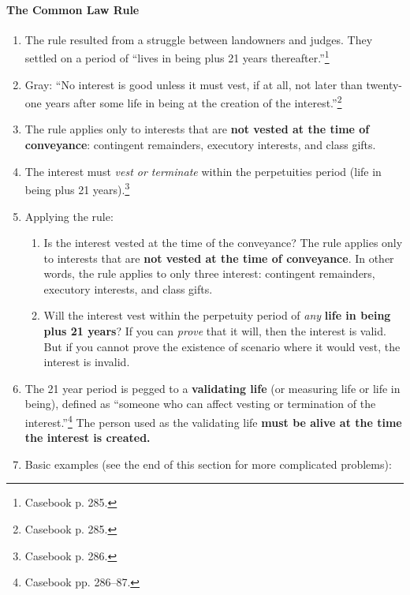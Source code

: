 \paragraph{The Common Law Rule}

\begin{enumerate}
    \item The rule resulted from a struggle between landowners and judges. 
    They settled on a period of ``lives in being plus 21 years 
    thereafter.''\footnote{Casebook p. 285.}
    \item Gray: ``No interest is good unless it must vest, if at all, not 
    later than twenty-one years after some life in being at the creation of 
    the interest.''\footnote{Casebook p. 285.}
    \item The rule applies only to interests that are \textbf{not vested at 
    the time of conveyance}: contingent remainders, executory 
    interests, and class gifts.
    \item The interest must \emph{vest or terminate} within the perpetuities 
    period (life in being plus 21 years).\footnote{Casebook p. 286.}
    \item Applying the rule:
    \begin{enumerate}
        \item Is the interest vested at the time of the conveyance? The rule 
        applies only to interests that are \textbf{not vested at the time of 
        conveyance}. In other words, the rule applies to only three interest: 
        contingent remainders, executory interests, and class gifts.
        \item Will the interest vest within the perpetuity period of 
        \emph{any} \textbf{life in being plus 21 years}? If you can 
        \emph{prove} that it will, then the interest is valid. But if you 
        cannot prove the existence of scenario where it would vest, the 
        interest is invalid.
    \end{enumerate}
    \item The 21 year period is pegged to a \textbf{validating life} (or 
    measuring life or life in being), defined as ``someone who can affect 
    vesting or termination of the interest.''\footnote{Casebook pp. 286--87.} 
    The person used as the validating life \textbf{must be alive at the time 
    the interest is created.}
    \item Basic examples (see the end of this section for more complicated 
    problems):
    \begin{enumerate}

\end{enumerate}
\end{enumerate}
